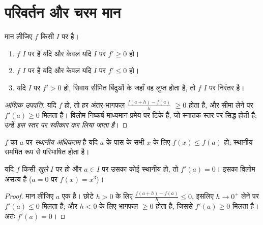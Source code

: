 \section{परिवर्तन और चरम मान}

\begin{theorem}[अवकलज का चिह्न और परिवर्तन]\label{thm:g12:deriv:variations}
मान लीजिए $f$ किसी  $I$ पर  है।
\begin{enumerate}
  \item $f$ $I$ पर  है यदि और केवल यदि $I$ पर $f' \geq 0$ हो।
  \item $f$ $I$ पर  है यदि और केवल यदि $I$ पर $f' \leq 0$ हो।
  \item यदि $I$ पर $f' > 0$ हो, सिवाय सीमित बिंदुओं के जहाँ वह लुप्त होता है,
        तो $f$ $I$ पर निरंतर  है।
\end{enumerate}
\end{theorem}

\begin{proof}[आंशिक उपपत्ति]
यदि $f$  हो, तो हर अंतर-भागफल $\frac{f(a+h)-f(a)}{h}$ $\geq 0$ होता है, और सीमा लेने पर
$f'(a) \geq 0$ मिलता है। विलोम निष्कर्ष माध्यमान प्रमेय पर टिके हैं, जो स्नातक स्तर
पर सिद्ध होती है; उन्हें \emph{इस स्तर पर स्वीकार कर लिया जाता है}।
\end{proof}

\begin{definition}[स्थानीय चरम मान]\label{def:g12:deriv:extremum}
$f$ का $a$ पर \emph{स्थानीय अधिकतम} है यदि $a$ के पास
के सभी $x$ के लिए $f(x) \leq f(a)$ हो; स्थानीय  सममित रूप से परिभाषित होता है।
\end{definition}

\begin{proposition}[प्रथम-कोटि की शर्त]\label{prop:g12:deriv:critical}
यदि $f$ किसी \emph{खुले}  $I$ पर  हो और $a \in I$ पर उसका कोई
स्थानीय  हो, तो $f'(a) = 0$। इसका विलोम असत्य है ($a = 0$ पर $f(x) = x^3$)।
\end{proposition}

\begin{proof}
मान लीजिए $a$ एक  है। छोटे $h > 0$ के लिए $\frac{f(a+h)-f(a)}{h} \leq 0$, इसलिए $h \to 0^+$
लेने पर $f'(a) \leq 0$ मिलता है; और $h < 0$ के लिए भागफल $\geq 0$ होता है, जिससे $f'(a) \geq 0$
मिलता है। अतः $f'(a) = 0$।
\end{proof}

